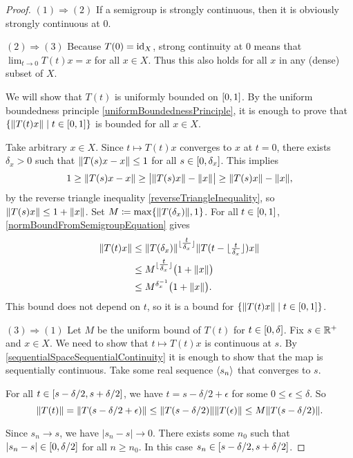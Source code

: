 \begin{proof}
$(1) \Rightarrow (2)$ If a semigroup is strongly continuous, then it is obviously strongly continuous at $0$.

$(2) \Rightarrow (3)$ Because $T(0) = \operatorname{id}_X$, strong continuity at $0$ means that $\lim_{t\to 0} T(t)x = x$ for all $x\in X$. Thus this also holds for all $x$ in any (dense) subset of $X$.

We will show that $T(t)$ is uniformly bounded on $\interval{0,1}$. By the uniform boundedness principle \ref{uniformBoundednessPrinciple}, it is enough to prove that $\setbuilder{\norm{T(t)x}}{t\in \interval{0,1}}$ is bounded for all $x\in X$.

Take arbitrary $x\in X$. Since $t\mapsto T(t)x$ converges to $x$ at $t=0$, there exists $\delta_x >0$ such that $\lVert T(s)x-x\rVert \leq 1$ for all $s\in \interval{0,\delta_x}$. This implies
\[ 1 \geq \lVert T(s)x-x\rVert \geq \big|\lVert T(s)x\rVert - \lVert x\rVert\big| \geq \lVert T(s)x\rVert - \lVert x\rVert, \]
by the reverse triangle inequality \ref{reverseTriangleInequality}, so $\lVert T(s)x\rVert \leq 1 + \lVert x\rVert$. Set $M \coloneqq \max\{\lVert T(\delta_x)\rVert, 1\}$. For all $t\in \interval{0,1}$, \ref{normBoundFromSemigroupEquation} gives
\begin{align*}
\lVert T(t)x\rVert &\leq \lVert T(\delta_x)\rVert^{\lfloor\tfrac{t}{\delta_x}\rfloor}\lVert T(t-\lfloor\tfrac{t}{\delta_x}\rfloor)x\rVert \\
&\leq M^{\lfloor\tfrac{t}{\delta_x}\rfloor}\big(1 + \lVert x\rVert\big) \\
&\leq M^{\delta_x^{-1}}\big(1 + \lVert x\rVert\big).
\end{align*}
This bound does not depend on $t$, so it is a bound for $\setbuilder{\norm{T(t)x}}{t\in \interval{0,1}}$.

$(3) \Rightarrow (1)$ Let $M$ be the uniform bound of $T(t)$ for $t\in \interval{0,\delta}$. Fix $s\in \mathbb{R}^+$ and $x\in X$. We need to show that $t\mapsto T(t)x$ is continuous at $s$. By \ref{sequentialSpaceSequentialContinuity} it is enough to show that the map is sequentially continuous. Take some real sequence $\left\langle s_n \right\rangle$ that converges to $s$.

For all $t\in \interval{s-\delta/2, s+\delta/2}$, we have $t = s-\delta/2+\epsilon$ for some $0\leq \epsilon \leq \delta$. So
\[ \lVert T(t)\rVert = \lVert T(s-\delta/2+\epsilon)\rVert \leq \lVert T(s-\delta/2)\rVert\lVert T(\epsilon)\rVert \leq M\lVert T(s-\delta/2)\rVert. \]

Since $s_n\to s$, we have $|s_n-s| \to 0$. There exists some $n_0$ such that $|s_n-s| \in \interval{0,\delta/2}$ for all $n\geq n_0$. In this case $s_n \in \interval{s-\delta/2, s+\delta/2}$.


\end{proof}
